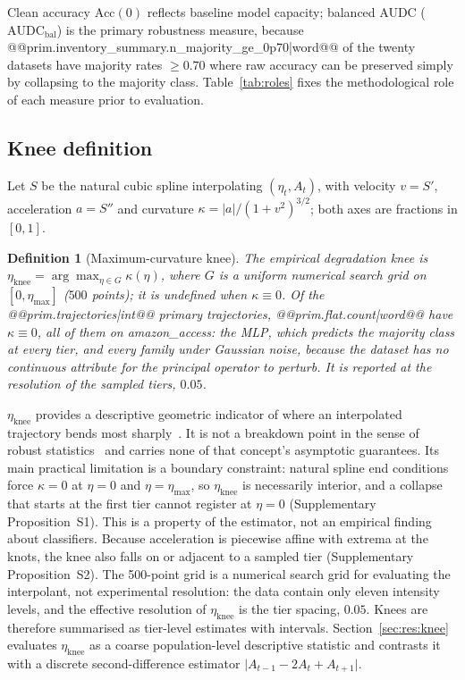 \documentclass[pdflatex,sn-mathphys]{sn-jnl}
\theoremstyle{thmstyleone}
\theoremstyle{thmstyletwo}
\theoremstyle{thmstylethree}
\newtheorem{definition}{Definition}
\newcommand{\Acc}{\mathrm{Acc}}
\newcommand{\AUDC}{\mathrm{AUDC}}
\newcommand{\etamax}{\eta_{\max}}
\newcommand{\etaknee}{\eta_{\mathrm{knee}}}
\begin{document}
Clean accuracy $\Acc(0)$ reflects baseline model capacity; balanced AUDC ($\AUDC_{\mathrm{bal}}$) is the primary robustness measure, because @@{prim.inventory_summary.n_majority_ge_0p70|word}@@ of the twenty datasets have majority rates $\ge 0.70$ where raw accuracy can be preserved simply by collapsing to the majority class. Table~\ref{tab:roles} fixes the methodological role of each measure prior to evaluation.

\subsection{Knee definition}\label{sec:problem:knee}

Let $S$ be the natural cubic spline interpolating $(\eta_t,A_t)$, with velocity $v=S'$, acceleration $a=S''$ and curvature $\kappa=\lvert a\rvert/(1+v^{2})^{3/2}$; both axes are fractions in $[0,1]$.

\begin{definition}[Maximum-curvature knee]\label{def:knee}
The empirical degradation knee is $\etaknee=\arg\max_{\eta\in G}\kappa(\eta)$, where $G$ is a uniform numerical search grid on $[0,\etamax]$ ($500$ points); it is undefined when $\kappa\equiv0$. Of the @@{prim.trajectories|int}@@ primary trajectories, @@{prim.flat.count|word}@@ have $\kappa\equiv0$, all of them on amazon\_access: the MLP, which predicts the majority class at every tier, and every family under Gaussian noise, because the dataset has no continuous attribute for the principal operator to perturb. It is reported at the resolution of the sampled tiers, $0.05$.
\end{definition}

$\etaknee$ provides a descriptive geometric indicator of where an interpolated trajectory bends most sharply~\cite{satopaa2011finding,salvador2004determining}. It is not a breakdown point in the sense of robust statistics~\cite{donoho1983notion} and carries none of that concept's asymptotic guarantees. Its main practical limitation is a boundary constraint: natural spline end conditions force $\kappa=0$ at $\eta=0$ and $\eta=\etamax$, so $\etaknee$ is necessarily interior, and a collapse that starts at the first tier cannot register at $\eta=0$ (Supplementary Proposition~S1). This is a property of the estimator, not an empirical finding about classifiers. Because acceleration is piecewise affine with extrema at the knots, the knee also falls on or adjacent to a sampled tier (Supplementary Proposition~S2). The 500-point grid is a numerical search grid for evaluating the interpolant, not experimental resolution: the data contain only eleven intensity levels, and the effective resolution of $\etaknee$ is the tier spacing, $0.05$. Knees are therefore summarised as tier-level estimates with intervals. Section~\ref{sec:res:knee} evaluates $\etaknee$ as a coarse population-level descriptive statistic and contrasts it with a discrete second-difference estimator $\lvert A_{t-1}-2A_t+A_{t+1}\rvert$.
\end{document}
